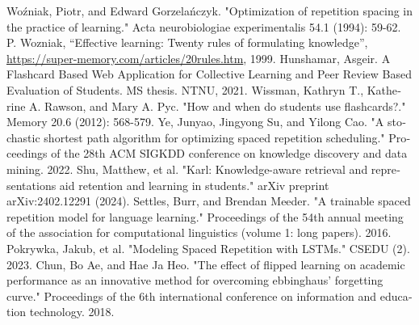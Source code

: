 \documentclass[12pt]{report}
\begin{document}
\begin{thebibliography}{MM}
    \begin{latin}
            Woźniak, Piotr, and Edward Gorzelańczyk. "Optimization of repetition spacing in the practice of learning." Acta neurobiologiae experimentalis 54.1 (1994): 59-62.        
            P. Wozniak, ``Effective learning: Twenty rules of formulating knowledge'', 
            \url{https://super-memory.com/articles/20rules.htm}, 1999.
            Hunshamar, Asgeir. A Flashcard Based Web Application for Collective Learning and Peer Review Based Evaluation of Students. MS thesis. NTNU, 2021.
            Wissman, Kathryn T., Katherine A. Rawson, and Mary A. Pyc. "How and when do students use flashcards?." Memory 20.6 (2012): 568-579.
            Ye, Junyao, Jingyong Su, and Yilong Cao. "A stochastic shortest path algorithm for optimizing spaced repetition scheduling." Proceedings of the 28th ACM SIGKDD conference on knowledge discovery and data mining. 2022.
            Shu, Matthew, et al. "Karl: Knowledge-aware retrieval and representations aid retention and learning in students." arXiv preprint arXiv:2402.12291 (2024).
            Settles, Burr, and Brendan Meeder. "A trainable spaced repetition model for language learning." Proceedings of the 54th annual meeting of the association for computational linguistics (volume 1: long papers). 2016.
            Pokrywka, Jakub, et al. "Modeling Spaced Repetition with LSTMs." CSEDU (2). 2023.
            Chun, Bo Ae, and Hae Ja Heo. "The effect of flipped learning on academic performance as an innovative method for overcoming ebbinghaus' forgetting curve." Proceedings of the 6th international conference on information and education technology. 2018.

    \end{latin}
\end{thebibliography}
\end{document}
